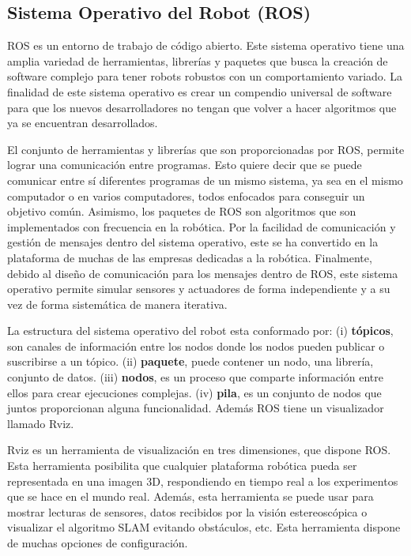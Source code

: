 \subsection{Sistema Operativo del Robot (ROS)}
ROS es un entorno de trabajo de código abierto. Este sistema operativo 
tiene una amplia variedad de herramientas, librerías y paquetes que busca 
la creación de software complejo para tener robots robustos con un comportamiento 
variado. La finalidad de este sistema operativo es crear un compendio universal de 
software para que los nuevos desarrolladores no tengan que volver a hacer algoritmos 
que ya se encuentran desarrollados.

El conjunto de herramientas y librerías que son proporcionadas por ROS, permite 
lograr una comunicación entre programas. Esto quiere decir que se puede comunicar 
entre sí diferentes programas de un mismo sistema, ya sea en el mismo computador 
o en varios computadores, todos enfocados para conseguir un objetivo común. 
Asimismo, los paquetes de ROS son algoritmos que son implementados con 
frecuencia en la robótica. Por la facilidad de comunicación y gestión de mensajes 
dentro del sistema operativo, este se ha convertido en la plataforma de muchas de 
las empresas dedicadas a la robótica. Finalmente, debido al diseño 
de comunicación para los mensajes dentro de ROS, este sistema operativo permite 
simular sensores y actuadores de forma independiente y a su vez de forma 
sistemática de manera iterativa.

La estructura del sistema operativo del robot esta conformado por: 
(i) \textbf{tópicos}, son canales de información entre los nodos donde los nodos 
pueden publicar o suscribirse a un tópico. (ii) \textbf{paquete}, puede contener un 
nodo, una librería, conjunto de datos. (iii) \textbf{nodos}, es un proceso que 
comparte información entre ellos para crear ejecuciones complejas. 
(iv) \textbf{pila}, es un conjunto de nodos que juntos proporcionan alguna 
funcionalidad. Además ROS tiene un visualizador llamado Rviz.

Rviz es un herramienta de visualización en tres dimensiones, que dispone 
ROS. Esta herramienta posibilita que cualquier plataforma robótica pueda ser 
representada en una imagen 3D, respondiendo en tiempo real a los experimentos que se 
hace en el mundo real. Además, esta herramienta se puede usar para mostrar lecturas 
de sensores, datos recibidos por la visión estereoscópica o visualizar el algoritmo 
SLAM evitando obstáculos, etc. Esta herramienta dispone de muchas opciones de 
configuración.

